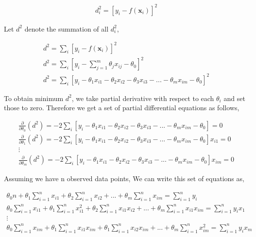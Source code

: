 \documentclass[english]{tktltiki}
\begin{document}
\begin{eqnarray}
d^2_i = [y_i - f(\mathbf{x}_i)]^2
\end{eqnarray}

Let $d^2$ denote the summation of all $d^2_i$,

\begin{eqnarray}
d^2 = \sum_i[y_i - f(\mathbf{x}_i)]^2 \nonumber\\
d^2 = \sum_i[y_i - \sum_{j=1}^m \theta_j x_{ij} - \theta_0]^2 \nonumber\\
d^2 = \sum_i[y_i - \theta_1x_{i1} - \theta_2x_{i2} - \theta_3x_{i3} - ... - \theta_mx_{im} - \theta_0]^2
\end{eqnarray}

To obtain minimum $d^2$, we take partial derivative with respect to each $\theta_i$ and set those to zero. Therefore we get a set of partial differential equations as follows,

\begin{eqnarray}
\frac{\partial}{\partial{\theta_0}}(d^2) = -2\sum_i[y_i - \theta_1x_{i1} - \theta_2x_{i2} - \theta_3x_{i3} - ... - \theta_mx_{im} - \theta_0] = 0\nonumber \\
\frac{\partial}{\partial{\theta_1}}(d^2) = -2\sum_i[y_i - \theta_1x_{i1} - \theta_2x_{i2} - \theta_3x_{i3} - ... - \theta_mx_{im} - \theta_0]x_{i1} = 0\nonumber \\
\vdots \nonumber \\
\frac{\partial}{\partial{\theta_m}}(d^2) = -2\sum_i[y_i - \theta_1x_{i1} - \theta_2x_{i2} - \theta_3x_{i3} - ... - \theta_mx_{im} - \theta_0]x_{im} = 0
\end{eqnarray}

Assuming we have n observed data points, We can write this set of equations as,

\begin{eqnarray}
\theta_0 n + \theta_1 \sum_{i=1}^n x_{i1} + \theta_2 \sum_{i=1}^n x_{i2} + ... + \theta_m \sum_{i=1}^n x_{im} = \sum_{i=1}^n y_i \nonumber \\
\theta_0 \sum_{i=1}^n x_{i1} + \theta_1 \sum_{i=1}^n x_{i1}^2 + \theta_2 \sum_{i=1}^n x_{i1} x_{i2} +  ... + \theta_m \sum_{i=1}^n x_{i1} x_{im} = \sum_{i=1}^n y_i x_1 \nonumber \\
\vdots \nonumber \\
\theta_0 \sum_{i=1}^n x_{im} + \theta_1 \sum_{i=1}^n x_{i1} x_{im} + \theta_1 \sum_{i=1}^n x_{i2} x_{im} + ... + \theta_m \sum_{i=1}^n x_{im}^2 = \sum_{i=1}^n y_i x_m
\end{eqnarray}
\end{document}
